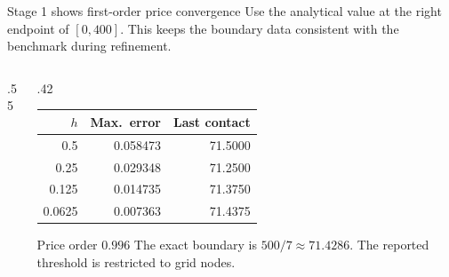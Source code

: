 \documentclass[aspectratio=169,11pt]{beamer}
\begin{document}
\begin{frame}[t]{Stage 1 shows first-order price convergence}
\small
Use the analytical value at the right endpoint of \([0,400]\).
This keeps the boundary data consistent with the benchmark during refinement.

\begin{columns}[T,onlytextwidth]
\begin{column}{.55\textwidth}
\centering
{}
\end{column}
\begin{column}{.42\textwidth}
\footnotesize
\begin{tabular}{@{}rrr@{}}
\toprule
\(h\) & Max.\ error & Last contact \\
\midrule
0.5    & 0.058473 & 71.5000 \\
0.25   & 0.029348 & 71.2500 \\
0.125  & 0.014735 & 71.3750 \\
0.0625 & 0.007363 & 71.4375 \\
\bottomrule
\end{tabular}

\begin{block}{Price order \(0.996\)}
The exact boundary is \(500/7\approx71.4286\).
The reported threshold is restricted to grid nodes.
\end{block}
\end{column}
\end{columns}
\end{frame}
\end{document}
